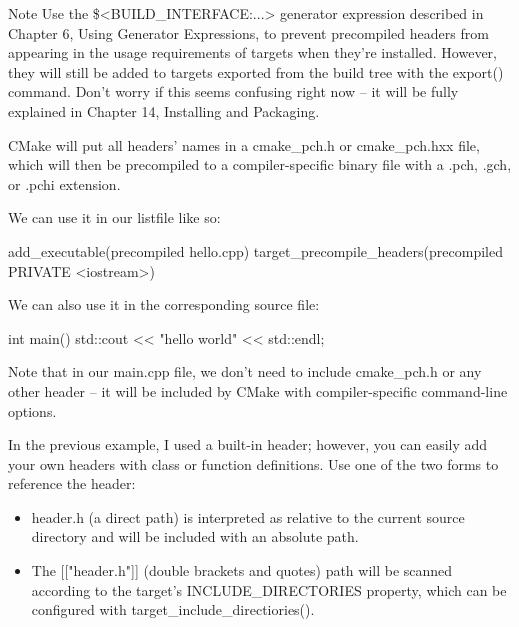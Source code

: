 \begin{myNotic}{Note}
Use the \$<BUILD\_INTERFACE:...> generator expression described in Chapter 6, Using Generator Expressions, to prevent precompiled headers from appearing in the usage requirements of targets when they’re installed. However, they will still be added to targets exported from the build tree with the export() command. Don’t worry if this seems confusing right now – it will be fully explained in Chapter 14, Installing and Packaging.
\end{myNotic}

CMake will put all headers’ names in a cmake\_pch.h or cmake\_pch.hxx file, which will then be precompiled to a compiler-specific binary file with a .pch, .gch, or .pchi extension.

We can use it in our listfile like so:


\begin{cmake}
add_executable(precompiled hello.cpp)
target_precompile_headers(precompiled PRIVATE <iostream>)
\end{cmake}

We can also use it in the corresponding source file:


\begin{cmake}
int main() {
    std::cout << "hello world" << std::endl;
}
\end{cmake}

Note that in our main.cpp file, we don’t need to include cmake\_pch.h or any other header – it will be included by CMake with compiler-specific command-line options.

In the previous example, I used a built-in header; however, you can easily add your own headers with class or function definitions. Use one of the two forms to reference the header:

\begin{itemize}
\item
header.h (a direct path) is interpreted as relative to the current source directory and will be included with an absolute path.

\item
The [["header.h"]] (double brackets and quotes) path will be scanned according to the target’s INCLUDE\_DIRECTORIES property, which can be configured with target\_include\_directiories().
\end{itemize}


